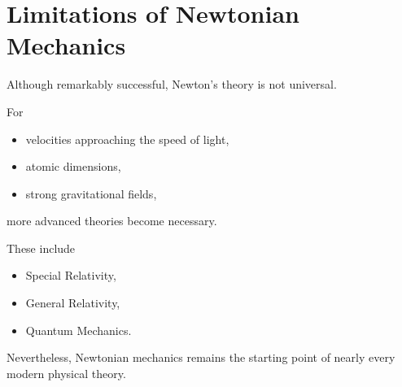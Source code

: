 \section{Limitations of Newtonian Mechanics}

Although remarkably successful, Newton's theory is not universal.

For

\begin{itemize}
	\item velocities approaching the speed of light,
	\item atomic dimensions,
	\item strong gravitational fields,
\end{itemize}

more advanced theories become necessary.

These include

\begin{itemize}
	\item Special Relativity,
	\item General Relativity,
	\item Quantum Mechanics.
\end{itemize}

Nevertheless, Newtonian mechanics remains the starting point of nearly every
modern physical theory.

